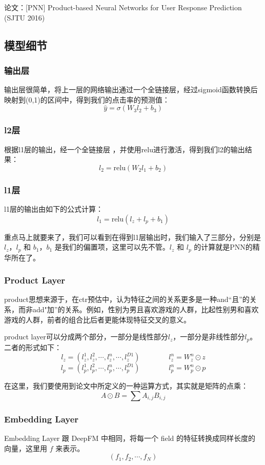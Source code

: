 \documentclass[12pt]{article}
\begin{document}
论文：[PNN] Product-based Neural Networks for User Response Prediction (SJTU 2016)

\subsection{模型细节}
\subsubsection{输出层}
输出层很简单，将上一层的网络输出通过一个全链接层，经过sigmoid函数转换后映射到(0,1)的区间中，得到我们的点击率的预测值：
$$
\hat{y} = \sigma(W_3l_2 + b_3)
$$

\subsubsection{l2层}
根据l1层的输出，经一个全链接层 ，并使用relu进行激活，得到我们l2的输出结果：
$$
l_2 = \text{relu}(W_2l_1 + b_2)
$$

\subsubsection{l1层}
l1层的输出由如下的公式计算：
$$
l_1 = \text{relu}(l_z + l_p + b_1)
$$

重点马上就要来了，我们可以看到在得到l1层输出时，我们输入了三部分，分别是$l_z$，$l_p$ 和 $b_1$，$b_1$ 是我们的偏置项，这里可以先不管。$l_z$ 和 $l_p$ 的计算就是PNN的精华所在了。

\subsubsection{Product Layer}
product思想来源于，在ctr预估中，认为特征之间的关系更多是一种and“且”的关系，而非add"加”的关系。例如，性别为男且喜欢游戏的人群，比起性别男和喜欢游戏的人群，前者的组合比后者更能体现特征交叉的意义。

product layer可以分成两个部分，一部分是线性部分$l_z$，一部分是非线性部分$l_p$。二者的形式如下：
$$
l_z = (l_z^1, l_z^2, \cdots, l_z^n, \cdots, l_z^{D1}) \qquad \qquad l_z^n   = W_z^n \odot z
$$
$$
l_p = (l_p^1, l_p^2, \cdots, l_p^n, \cdots, l_p^{D1}) \qquad \qquad l_p^n   = W_p^n \odot p
$$

在这里，我们要使用到论文中所定义的一种运算方式，其实就是矩阵的点乘：
$$
A \odot B = \sum A_{i,j}B_{i,j}
$$

\subsubsection{Embedding Layer}
Embedding Layer 跟 DeepFM 中相同，将每一个 field 的特征转换成同样长度的向量，这里用 $f$ 来表示。
$$
(f_1, f_2, \cdots, f_N)
$$
\end{document}
